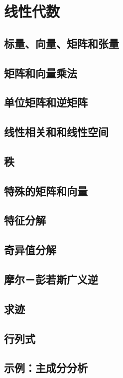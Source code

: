 \chapter{线性代数}
\label{chap:2}
\section{标量、向量、矩阵和张量}
\label{sec:2.1}

\section{矩阵和向量乘法}
\label{sec:2.2}

\section{单位矩阵和逆矩阵}
\label{sec:2.3}

\section{线性相关和和线性空间}
\label{sec:2.4}

\section{秩}
\label{sec:2.5}

\section{特殊的矩阵和向量}
\label{sec:2.6}

\section{特征分解}
\label{sec:2.7}

\section{奇异值分解}
\label{sec:2.8}

\section{摩尔－彭若斯广义逆}
\label{sec:2.9}

\section{求迹}
\label{sec:2.10}

\section{行列式}
\label{sec:2.11}

\section{示例：主成分分析}
\label{sec:2.12}